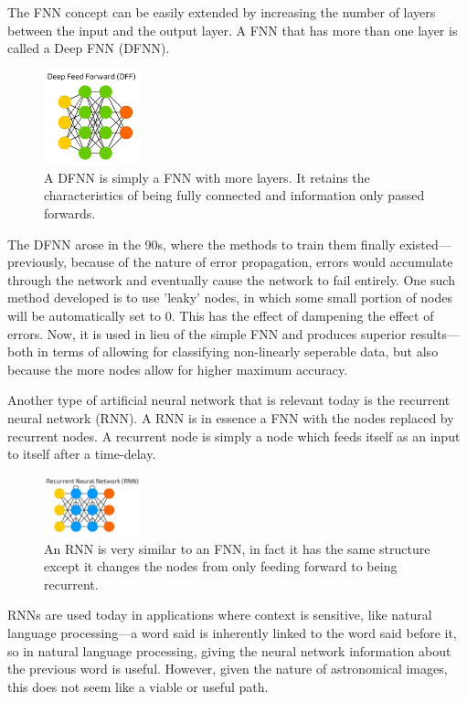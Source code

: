 \documentclass[a4paper,11pt]{article}
\begin{document}
The FNN concept can be easily extended by increasing the number of layers between the input and the output layer. A FNN that has more than one layer is called a Deep FNN (DFNN). 

\begin{figure}[ht]
\centering
\includegraphics[width=0.25\textwidth]{DFF.png}
\caption{\label{fig:FNN}A DFNN is simply a FNN with more layers. It retains the characteristics of being fully connected and information only passed forwards.\cite{tch_2017_the}}
\end{figure}

The DFNN arose in the 90s, where the methods to train them finally existed—previously, because of the nature of error propagation, errors would accumulate through the network and eventually cause the network to fail entirely. One such method developed is to use 'leaky' nodes, in which some small portion of nodes will be automatically set to 0. This has the effect of dampening the effect of errors. Now, it is used in lieu of the simple FNN and produces superior results—both in terms of allowing for classifying non-linearly seperable data, but also because the more nodes allow for higher maximum accuracy.

Another type of artificial neural network that is relevant today is the recurrent neural network (RNN). A RNN is in essence a FNN with the nodes replaced by recurrent nodes. A recurrent node is simply a node which feeds itself as an input to itself after a time-delay. 
\begin{figure}[ht]
\centering
\includegraphics[width=0.25\textwidth]{RNN.png}
\caption{\label{fig:RNN}An RNN is very similar to an FNN, in fact it has the same structure except it changes the nodes from only feeding forward to being recurrent.\cite{tch_2017_the}}
\end{figure}

RNNs are used today in applications where context is sensitive, like natural language processing—a word said is inherently linked to the word said before it, so in natural language processing, giving the neural network information about the previous word is useful. However, given the nature of astronomical images, this does not seem like a viable or useful path.
\end{document}

